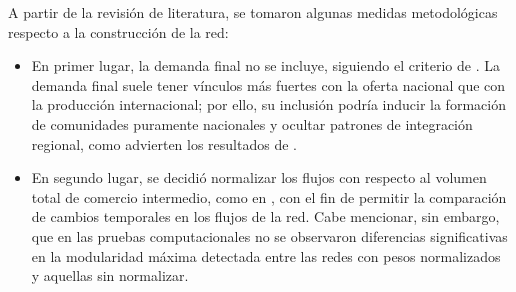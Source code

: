 A partir de la revisión de literatura, se tomaron algunas medidas metodológicas respecto a la construcción de la red:
\begin{itemize}
	\item En primer lugar, la demanda final no se incluye, siguiendo el criterio de \textcite{Cerina2015}. La demanda final suele tener vínculos más fuertes con la oferta nacional que con la producción internacional; por ello, su inclusión podría inducir la formación de comunidades puramente nacionales y ocultar patrones de integración regional, como advierten los resultados de  \textcite[pp.~17--18]{Piccardi2018}.
	\item En segundo lugar, se decidió normalizar los flujos con respecto al volumen total de comercio intermedio, como en \textcite{Maluck2015}, con el fin de permitir la comparación de cambios temporales en los flujos de la red. Cabe mencionar, sin embargo, que en las pruebas computacionales no se observaron diferencias significativas en la modularidad máxima detectada entre las redes con pesos normalizados y aquellas sin normalizar.
\end{itemize}
